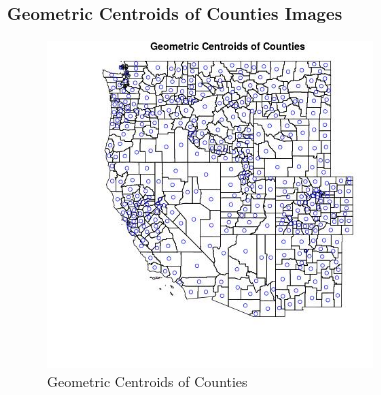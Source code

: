 
\subsubsection{Geometric Centroids of Counties Images} 
 

\begin{figure} 
\centering  
\includegraphics[width=0.77\textwidth]{Code_Outputs/CountyGeometricCentroids_MapLocations.jpg} 
\caption{\label{fig:CountyGeometricCentroidsMapLocations}Geometric Centroids of Counties} 
\end{figure} 
 
